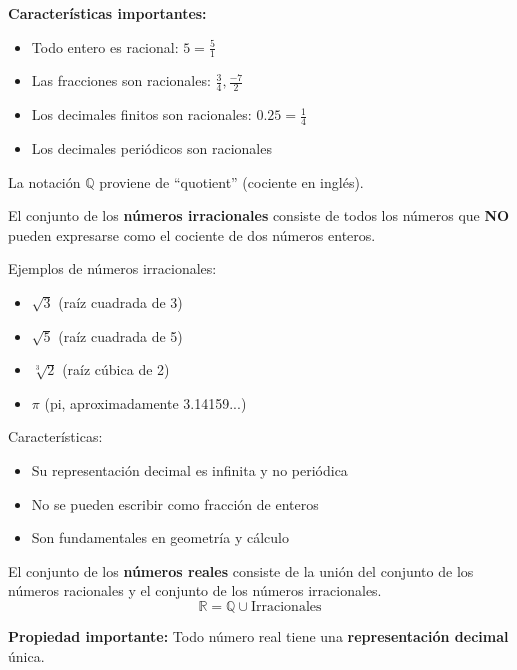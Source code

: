 \textbf{Características importantes:}
\begin{itemize}
\item Todo entero es racional: $5 = \frac{5}{1}$
\item Las fracciones son racionales: $\frac{3}{4}, \frac{-7}{2}$
\item Los decimales finitos son racionales: $0.25 = \frac{1}{4}$
\item Los decimales periódicos son racionales
\end{itemize}

La notación $\mathbb{Q}$ proviene de ``quotient'' (cociente en inglés).


\begin{definition}
El conjunto de los \textbf{números irracionales} consiste de todos los números que \textbf{NO} pueden expresarse como el cociente de dos números enteros.
\end{definition}

\begin{example}
Ejemplos de números irracionales:
\begin{itemize}
\item $\sqrt{3}$ (raíz cuadrada de 3)
\item $\sqrt{5}$ (raíz cuadrada de 5)
\item $\sqrt[3]{2}$ (raíz cúbica de 2)
\item $\pi$ (pi, aproximadamente 3.14159...)
\end{itemize}

Características:
\begin{itemize}
\item Su representación decimal es infinita y no periódica
\item No se pueden escribir como fracción de enteros
\item Son fundamentales en geometría y cálculo
\end{itemize}
\end{example}


\begin{definition}
El conjunto de los \textbf{números reales} consiste de la unión del conjunto de los números racionales y el conjunto de los números irracionales.
$$\mathbb{R} = \mathbb{Q} \cup \text{Irracionales}$$
\end{definition}

\textbf{Propiedad importante:} Todo número real tiene una \textbf{representación decimal} única.

